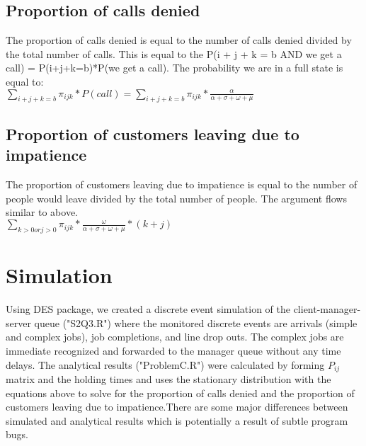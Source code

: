 \documentclass[10pt,a4paper]{article}
\begin{document}
\subsection{Proportion of calls denied}
The proportion of calls denied is equal to the number of calls denied divided by the total number of calls. This is equal to the P(i + j + k = b AND we get a call) = P(i+j+k=b)*P(we get a call). The probability we are in a full state is equal to:\\
$\sum\limits_{i+j+k = b} \pi_{ijk}*P(call) = \sum\limits_{i+j+k = b} \pi_{ijk}*\frac{\alpha}{\alpha + \sigma + \omega + \mu}$
\subsection{Proportion of customers leaving due to impatience}
The proportion of customers leaving due to impatience is equal to the number of people would leave divided by the total number of people. The argument flows similar to above.\\
$\sum\limits_{k > 0 or j > 0} \pi_{ijk}*\frac{\omega}{\alpha + \sigma + \omega + \mu}*(k+j)$
\section{Simulation}
Using DES package, we created a discrete event simulation of the client-manager-server queue ("S2Q3.R") where the monitored discrete events are arrivals (simple and complex jobs), job completions, and line drop outs. The complex jobs are immediate recognized and forwarded to the manager queue without any time delays. The analytical results ("ProblemC.R") were calculated by forming $P_{ij}$ matrix and the holding times and uses the stationary distribution with the equations above to solve for the proportion of calls denied and the proportion of customers leaving due to impatience.There are some major differences between simulated and analytical results which is potentially a result of subtle program bugs.


\end{document}
